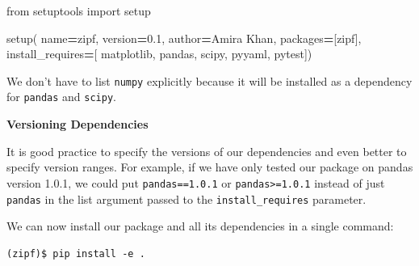 \documentclass[
]{krantz}
\makeatletter
\newenvironment{Shaded}{\begin{snugshade}}{\end{snugshade}}
\newcommand{\ImportTok}[1]{#1}
\newcommand{\NormalTok}[1]{#1}
\newcommand{\OperatorTok}[1]{\textcolor[rgb]{0.81,0.36,0.00}{\textbf{#1}}}
\newcommand{\StringTok}[1]{\textcolor[rgb]{0.31,0.60,0.02}{#1}}
\renewenvironment{quote}{\begin{VF}}{\end{VF}}
\newenvironment{kframe}{%
\medskip{}
\setlength{\fboxsep}{.8em}
 \def\at@end@of@kframe{}%
 \ifinner\ifhmode%
  \def\at@end@of@kframe{\end{minipage}}%
  \begin{minipage}{\columnwidth}%
 \fi\fi%
 \def\FrameCommand##1{\hskip\@totalleftmargin \hskip-\fboxsep
 \colorbox{shadecolor}{##1}\hskip-\fboxsep
     \hskip-\linewidth \hskip-\@totalleftmargin \hskip\columnwidth}%
 \MakeFramed {\advance\hsize-\width
   \@totalleftmargin\z@ \linewidth\hsize
   \@setminipage}}%
 {\par\unskip\endMakeFramed%
 \at@end@of@kframe}
\renewenvironment{Shaded}{\begin{kframe}}{\end{kframe}}
\makeatother
\begin{document}
\begin{Shaded}
\begin{Highlighting}[]
\ImportTok{from}\NormalTok{ setuptools }\ImportTok{import}\NormalTok{ setup}


\NormalTok{setup(}
\NormalTok{    name}\OperatorTok{=}\StringTok{\textquotesingle{}zipf\textquotesingle{}}\NormalTok{,}
\NormalTok{    version}\OperatorTok{=}\StringTok{\textquotesingle{}0.1\textquotesingle{}}\NormalTok{,}
\NormalTok{    author}\OperatorTok{=}\StringTok{\textquotesingle{}Amira Khan\textquotesingle{}}\NormalTok{,}
\NormalTok{    packages}\OperatorTok{=}\NormalTok{[}\StringTok{\textquotesingle{}zipf\textquotesingle{}}\NormalTok{],}
\NormalTok{    install\_requires}\OperatorTok{=}\NormalTok{[}
        \StringTok{\textquotesingle{}matplotlib\textquotesingle{}}\NormalTok{,}
        \StringTok{\textquotesingle{}pandas\textquotesingle{}}\NormalTok{,}
        \StringTok{\textquotesingle{}scipy\textquotesingle{}}\NormalTok{,}
        \StringTok{\textquotesingle{}pyyaml\textquotesingle{}}\NormalTok{,}
        \StringTok{\textquotesingle{}pytest\textquotesingle{}}\NormalTok{])}
\end{Highlighting}
\end{Shaded}

We don't have to list \texttt{numpy} explicitly
because it will be installed as a dependency for \texttt{pandas} and \texttt{scipy}.

\begin{quote}
\textbf{Versioning Dependencies}

It is good practice to specify the versions of our dependencies
and even better to specify version ranges.
For example, if we have only tested our package on pandas version 1.0.1,
we could put \texttt{pandas==1.0.1} or \texttt{pandas\textgreater{}=1.0.1} instead of just \texttt{pandas}
in the list argument passed to the \texttt{install\_requires} parameter.
\end{quote}

We can now install our package and all its dependencies in a single command:

\begin{verbatim}
(zipf)$ pip install -e .
\end{verbatim}
\end{document}
